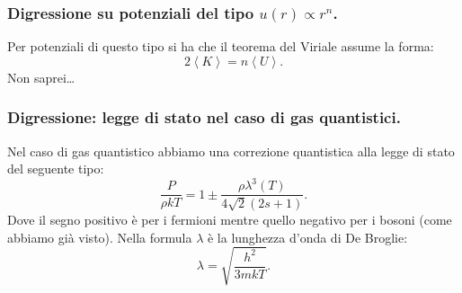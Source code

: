 \subsubsection{Digressione su potenziali del tipo $u(r) \propto r^n$.}
\label{subsubsec:Digressione su potenziali polinomiali.}
Per potenziali di questo tipo si ha che il teorema del Viriale assume la forma:
\[
	2\left<K \right> = n\left< U \right>
.\] 
Non saprei\ldots\\
\subsubsection{Digressione: legge di stato nel caso di gas quantistici.}
\label{subsubsec:Digressione: legge di stato nel caso di gas quantistici.}
Nel caso di gas quantistico abbiamo una correzione quantistica alla legge di stato del seguente tipo:
\[
	\frac{P}{\rho kT}
	=
	1 \pm \frac{\rho \lambda^3(T)}{4\sqrt{2} \left( 2s + 1 \right) }
.\] 
Dove il segno positivo è per i fermioni mentre quello negativo per i bosoni (come abbiamo già visto). Nella formula $\lambda$ è la lunghezza d'onda di De Broglie:
\[
	\lambda=\sqrt{\frac{h^2}{3mkT}} 
.\] 
